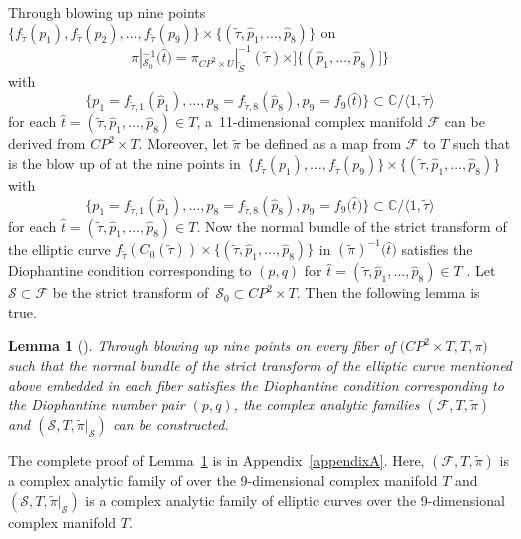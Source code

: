 \documentclass[10pt,a4paper]{amsart}
\numberwithin{equation}{section}
\newtheorem{Lemma}[Theorem]{Lemma}
\def\operatorname#1{#1}
\def\overline#1{#1}
\begin{document}
Through blowing up nine points $ \{ f_{\widetilde{\tau}}(p_1),f_{\widetilde{\tau}}(p_2),\dots ,f_{\widetilde{\tau}}(p_9) \} \times \{ (\widetilde{\tau},\hat{p}_1,\dots ,\hat{p}_8) \}$ on
\[\pi|^{-1}_{\mathcal{S}_0}\bigl(\hat{t}\bigr)=\pi_{\operatorname{CP}^2 \times U}|^{-1}_{\widetilde{S}}(\widetilde{\tau})\times ] \{ (\hat{p}_1,\dots ,\hat{p}_8) ] \}
\]
 with
 \[
 \big \{ p_1=f_{\widetilde{\tau},1}(\hat{p}_1),\dots ,p_8=f_{\widetilde{\tau},8}(\hat{p}_8),p_9=f_9\bigl(\hat{t}\bigr) \big \}\subset \mathbb{C}/ \langle 1, \widetilde{\tau} \rangle
 \]
 for each ${\hat{t}=(\widetilde{\tau},\hat{p}_1,\dots ,\hat{p}_8)\in T}$, a~11-dimensional complex manifold $\mathcal{F}$ can be derived from $\operatorname{CP}^2 \times T$. Moreover, let $\widetilde{\pi}$ be defined as a map from $\mathcal{F}$ to $T$ such that  is the blow up of  at the nine points in~$ { \{ f_{\widetilde{\tau}}(p_1),\dots ,f_{\widetilde{\tau}}(p_9) \} \times \{ (\widetilde{\tau},\hat{p}_1,\dots ,\hat{p}_8) \}}$ with
\[
\{ p_1=f_{\widetilde{\tau},1}(\hat{p}_1),\dots , p_8=f_{\widetilde{\tau},8}(\hat{p}_8),p_9=f_9\bigl(\hat{t}\bigr) \}\subset \mathbb{C}/ \langle 1, \widetilde{\tau} \rangle
\]
for each $\hat{t}=(\widetilde{\tau},\hat{p}_1,\dots ,\hat{p}_8)\in T$. Now the normal bundle of the strict transform of the elliptic curve $f_{\widetilde{\tau}}(C_0(\widetilde{\tau}))\times \{ (\widetilde{\tau}, \hat{p}_1,\dots ,\hat{p}_8) \}$ in $(\widetilde{\pi})^{-1}\bigl(\hat{t}\bigr)$ satisfies the Diophantine condition corresponding to $(p,q)$ for $\hat{t}=(\widetilde{\tau},\hat{p}_1,\dots ,\hat{p}_8)\in T$ \cite{Takayuki-Takato2}. Let $\mathcal{S} \subset \mathcal{F}$ be the strict transform of~${\mathcal{S}_0 \subset \operatorname{CP}^2 \times T}$. Then the following lemma is true.

\begin{Lemma}[{\cite{Takayuki-Takato1}}] \label{Lemma3.3}
 Through blowing up nine points on every fiber of \emph{$\bigl(\operatorname{CP}^2 \times T,T, \pi\bigr)$} such that the normal bundle of the strict transform of the elliptic curve mentioned above embedded in each fiber satisfies the Diophantine condition corresponding to the Diophantine number pair $(p,q)$, the complex analytic families \emph{$(\mathcal{F},T, \widetilde{\pi})$} and \emph{$(\mathcal{S},T, \widetilde{\pi}|_\mathcal{S})$} can be constructed.
\end{Lemma}

The complete proof of Lemma~\ref{Lemma3.3} is in Appendix~\ref{appendixA}. Here, $(\mathcal{F},T, \widetilde{\pi})$ is a complex analytic family of \smash{$\operatorname{CP}^2 \#9 \overline{\operatorname{CP}}^2$} over the 9-dimensional complex manifold $T$ and $(\mathcal{S},T, \widetilde{\pi}|_\mathcal{S})$ is a complex analytic family of elliptic curves over the 9-dimensional complex manifold $T$.
\end{document}
